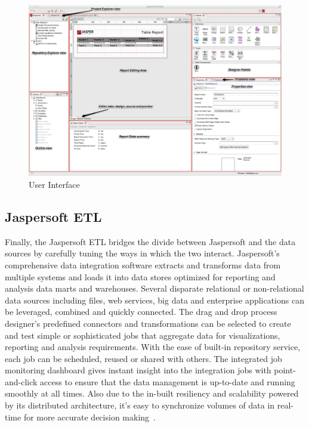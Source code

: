 \begin{figure}[!ht]
        \centering\includegraphics[width=\columnwidth]{../images/user-interface.jpg}
        \caption{User Interface~\cite{hid-sp18-516-www-jaspersoft-studio}}
        \label{fig:user-interface}
\end{figure}

\subsection{Jaspersoft ETL}
Finally, the Jaspersoft ETL bridges the divide between Jaspersoft and the data
sources by carefully tuning the ways in which the two interact. Jaspersoft's
comprehensive data integration software extracts and transforms data from
multiple systems and loads it into data stores optimized for reporting and
analysis data marts and warehouses. Several disparate relational or
non-relational data sources including files, web services, big data and
enterprise applications can be leveraged, combined and quickly connected. The
drag and drop process designer's predefined connectors and transformations can
be selected to create and test simple or sophisticated jobs that aggregate data
for visualizations, reporting and analysis requirements. With the ease of
built-in repository service, each job can be scheduled, reused or shared with
others. The integrated job monitoring dashboard gives instant insight into the
integration jobs with point-and-click access to ensure that the data management
is up-to-date and running smoothly at all times. Also due to the in-built
resiliency and scalability powered by its distributed architecture, it's easy to
synchronize volumes of data in real-time for more accurate decision
making~\cite{hid-sp18-516-www-data-integration}.


